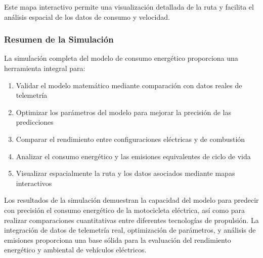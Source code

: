 Este mapa interactivo permite una visualización detallada de la ruta y facilita el análisis espacial de los datos de consumo y velocidad.

\subsubsection{Resumen de la Simulación}

La simulación completa del modelo de consumo energético proporciona una herramienta integral para:

\begin{enumerate}
    \item Validar el modelo matemático mediante comparación con datos reales de telemetría
    \item Optimizar los parámetros del modelo para mejorar la precisión de las predicciones
    \item Comparar el rendimiento entre configuraciones eléctricas y de combustión
    \item Analizar el consumo energético y las emisiones equivalentes de ciclo de vida
    \item Visualizar espacialmente la ruta y los datos asociados mediante mapas interactivos
\end{enumerate}

Los resultados de la simulación demuestran la capacidad del modelo para predecir con precisión el consumo energético de la motocicleta eléctrica, así como para realizar comparaciones cuantitativas entre diferentes tecnologías de propulsión. La integración de datos de telemetría real, optimización de parámetros, y análisis de emisiones proporciona una base sólida para la evaluación del rendimiento energético y ambiental de vehículos eléctricos.

